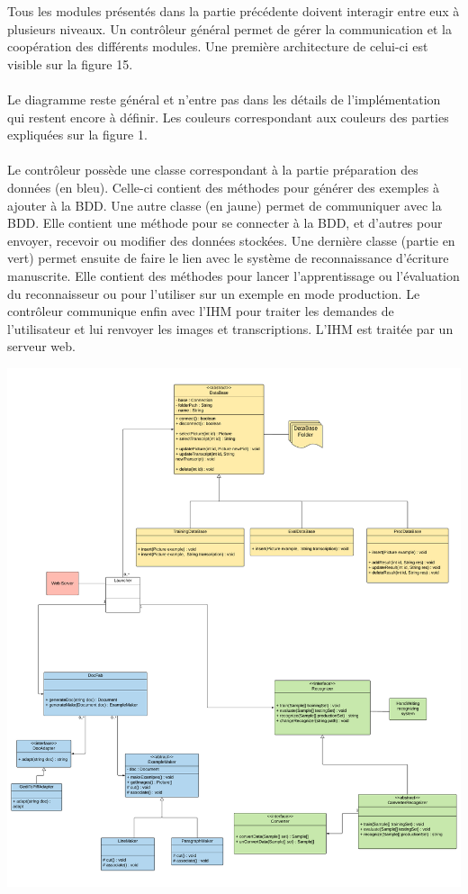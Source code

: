 Tous les modules présentés dans la partie précédente doivent interagir entre
eux à plusieurs niveaux. Un contrôleur général permet de gérer la communication
et la coopération des différents modules. Une première architecture de celui-ci
est visible sur la figure 15.

\paragraph{}
Le diagramme reste général et n’entre pas dans les détails de l’implémentation
qui restent encore à définir. Les couleurs correspondant aux couleurs des
parties expliquées sur la figure 1.

\paragraph{}
Le contrôleur possède une classe correspondant à la partie préparation des
données (en bleu). Celle-ci contient des méthodes pour générer des exemples
à ajouter à la BDD. Une autre classe (en jaune) permet de communiquer avec
la BDD. Elle contient une méthode pour se connecter à la BDD, et d’autres pour
envoyer, recevoir ou modifier des données stockées. Une dernière classe
(partie en vert) permet ensuite de faire le lien avec le système de
reconnaissance d’écriture manuscrite. Elle contient des méthodes pour lancer
l’apprentissage ou l’évaluation du reconnaisseur ou pour l’utiliser sur un
exemple en mode production. Le contrôleur communique enfin avec l’IHM pour
traiter les demandes de l’utilisateur et lui renvoyer les images et
transcriptions. L’IHM est traitée par un serveur web.

\newpage

\begin{mdframed}[frametitle={Figure 16 : Diagramme de classes du contrôleur}, innerbottommargin=10]
\begin{center}
\includegraphics[scale=0.3]{Specifications.pdf}
\end{center}
\end{mdframed}

